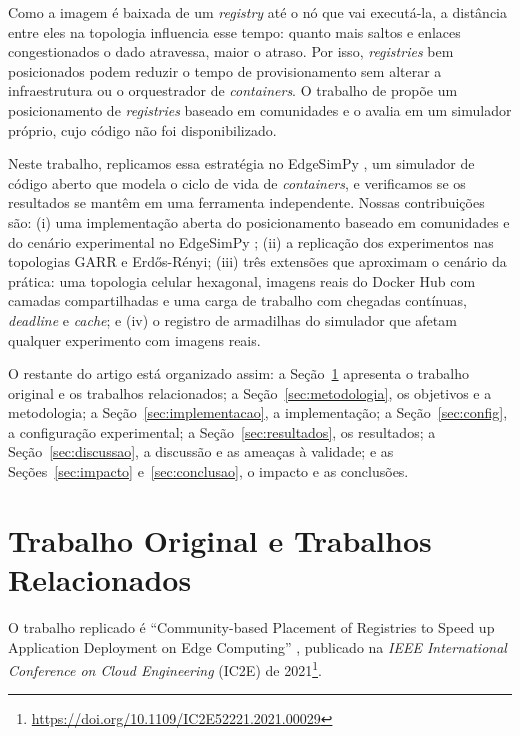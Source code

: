 \documentclass[12pt]{article}
\begin{document}
Como a imagem é baixada de um \textit{registry} até o nó que vai executá-la, a
distância entre eles na topologia influencia esse tempo: quanto mais saltos e
enlaces congestionados o dado atravessa, maior o atraso. Por isso,
\textit{registries} bem posicionados podem reduzir o tempo de provisionamento sem
alterar a infraestrutura ou o orquestrador de \textit{containers}. O trabalho de
\cite{knob2021} propõe um posicionamento de \textit{registries} baseado em
comunidades e o avalia em um simulador próprio, cujo código não foi
disponibilizado.

Neste trabalho, replicamos essa estratégia no EdgeSimPy \cite{souza2023}, um
simulador de código aberto que modela o ciclo de vida de \textit{containers}, e
verificamos se os resultados se mantêm em uma ferramenta independente. Nossas
contribuições são: (i) uma implementação aberta do posicionamento baseado em
comunidades e do cenário experimental no EdgeSimPy \cite{repositorio}; (ii) a
replicação dos experimentos nas topologias GARR e Erdős-Rényi; (iii) três
extensões que aproximam o cenário da prática: uma topologia celular hexagonal,
imagens reais do Docker Hub com camadas compartilhadas e uma carga de trabalho
com chegadas contínuas, \textit{deadline} e \textit{cache}; e (iv) o registro de
armadilhas do simulador que afetam qualquer experimento com imagens reais.

O restante do artigo está organizado assim: a Seção~\ref{sec:base} apresenta o
trabalho original e os trabalhos relacionados; a Seção~\ref{sec:metodologia}, os objetivos e a metodologia; a
Seção~\ref{sec:implementacao}, a implementação; a Seção~\ref{sec:config}, a
configuração experimental; a Seção~\ref{sec:resultados}, os resultados; a
Seção~\ref{sec:discussao}, a discussão e as ameaças à validade; e as
Seções~\ref{sec:impacto} e~\ref{sec:conclusao}, o impacto e as conclusões.

\section{Trabalho Original e Trabalhos Relacionados}
\label{sec:base}

O trabalho replicado é ``Community-based Placement of Registries to Speed up
Application Deployment on Edge Computing'' \cite{knob2021}, publicado na
\textit{IEEE International Conference on Cloud Engineering} (IC2E) de
2021\footnote{\url{https://doi.org/10.1109/IC2E52221.2021.00029}}.
\end{document}
